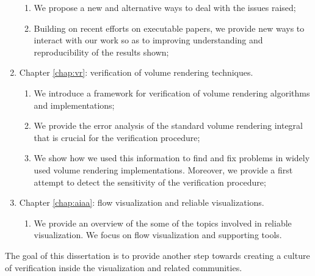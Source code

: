 \begin{enumerate}
\begin{enumerate}
\item We propose a new and alternative ways to deal with the issues raised;
\item Building on recent efforts on executable papers, we provide new ways to interact with our work so as to improving understanding and reproducibility of the results shown;
\end{enumerate}
\item Chapter \ref{chap:vr}: verification of volume rendering techniques.
\begin{enumerate}
\item We introduce a framework for verification of volume rendering algorithms and implementations;
\item We provide the error analysis of the standard volume rendering integral that is crucial for the verification procedure;
\item We show how we used this information to find and fix problems in widely used volume rendering  implementations. Moreover, we provide a first attempt to detect the sensitivity of the verification procedure;
\end{enumerate}
\item Chapter \ref{chap:aiaa}: flow visualization and reliable visualizations.
\begin{enumerate}
\item We provide an overview of the some of the topics involved in reliable visualization. We focus on flow visualization and supporting tools.
\end{enumerate}
\end{enumerate}
The goal of this dissertation is to provide another step towards creating a culture of verification inside the visualization and related communities.

